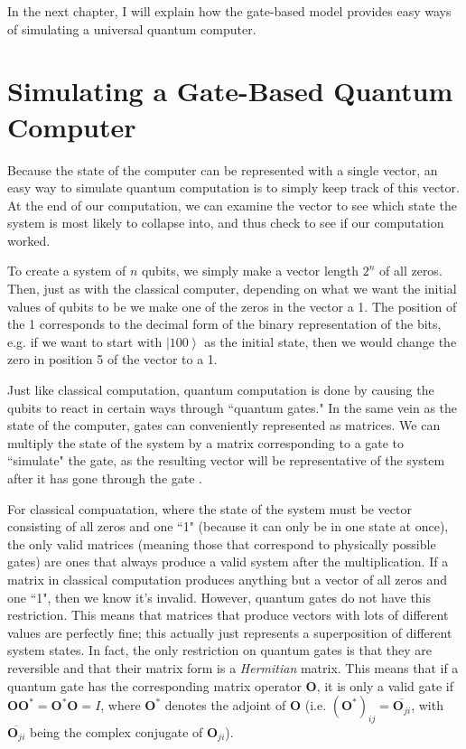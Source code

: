 \documentclass[11pt]{report}
\newcommand{\?}{\stackrel{?}{=}}
\begin{document}
In the next chapter, I will explain how the gate-based model provides easy ways of simulating a universal quantum computer.

\chapter{Simulating a Gate-Based Quantum Computer}

Because the state of the computer can be represented with a single vector, an easy way to simulate quantum computation is to simply keep track of this vector. At the end of our computation, we can examine the vector to see which state the system is most likely to collapse into, and thus check to see if our computation worked.

To create a system of $n$ qubits, we simply make a vector length $2^{n}$ of all zeros. Then, just as with the classical computer, depending on what we want the initial values of qubits to be we make one of the zeros in the vector a 1. The position of the 1 corresponds to the decimal form of the binary representation of the bits, e.g. if we want to start with $\left | 100 \right \rangle$ as the initial state, then we would change the zero in position 5 of the vector to a 1.

Just like classical computation, quantum computation is done by causing the qubits to react in certain ways through ``quantum gates." In the same vein as the state of the computer, gates can conveniently represented as matrices. We can multiply the state of the system by a matrix corresponding to a gate to ``simulate" the gate, as the resulting vector will be representative of the system after it has gone through the gate \cite{spector04}.

For classical compuatation, where the state of the system must be vector consisting of all zeros and one ``1" (because it can only be in one state at once), the only valid matrices (meaning those that correspond to physically possible gates) are ones that always produce a valid system after the multiplication. If a matrix in classical computation produces anything but a vector of all zeros and one ``1", then we know it's invalid. However, quantum gates do not have this restriction. This means that matrices that produce vectors with lots of different values are perfectly fine; this actually just represents a superposition of different system states. In fact, the only restriction on quantum gates is that they are reversible and that their matrix form is a \textit{Hermitian} matrix. This means that if a quantum gate has the corresponding matrix operator $\mathbf{O}$, it is only a valid gate if $\mathbf{O}\mathbf{O}^* = \mathbf{O}^*\mathbf{O} = I$, where $\mathbf{O}^*$ denotes the adjoint of $\mathbf{O}$ (i.e. $(\mathbf{O}^*)_{ij} = \overline{\mathbf{O}_{ji}}$, with $\overline{\mathbf{O}_{ji}}$ being the complex conjugate of $\mathbf{O}_{ji}$).
\end{document}

